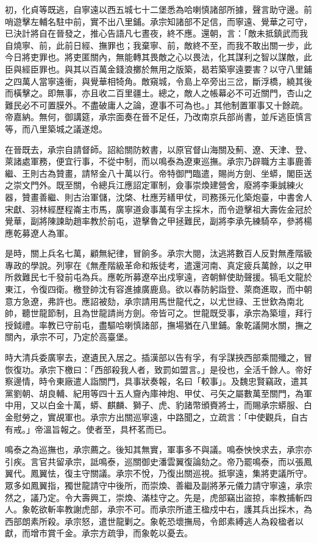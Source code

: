 \begin{pinyinscope}
初，化貞等既逃，自寧遠以西五城七十二堡悉為哈喇慎諸部所據，聲言助守邊。前哨遊擊左輔名駐中前，實不出八里鋪。承宗知諸部不足信，而寧遠、覺華之可守，已決計將自在晉發之，推心告語凡七晝夜，終不應。還朝，言：「敵未抵鎮武而我自燒寧、前，此前日經、撫罪也；我棄寧、前，敵終不至，而我不敢出關一步，此今日將吏罪也。將吏匿關內，無能轉其畏敵之心以畏法，化其謀利之智以謀敵，此臣與經臣罪也。與其以百萬金錢浪擲於無用之版築，曷若築寧遠要害？以守八里鋪之四萬人當寧遠衝，與覺華相犄角。敵窺城，令島上卒旁出三岔，斷浮橋，繞其後而橫擊之。即無事，亦且收二百里疆土。總之，敵人之帳幕必不可近關門，杏山之難民必不可置膜外。不盡破庸人之論，遼事不可為也。」其他制置軍事又十餘疏。帝嘉納。無何，御講筵，承宗面奏在晉不足任，乃改南京兵部尚書，並斥逃臣慎言等，而八里築城之議遂熄。

在晉既去，承宗自請督師。詔給關防敕書，以原官督山海關及薊、遼、天津、登、萊諸處軍務，便宜行事，不從中制，而以鳴泰為遼東巡撫。承宗乃辟職方主事鹿善繼、王則古為贊畫，請帑金八十萬以行。帝特御門臨遣，賜尚方劍、坐蟒，閣臣送之崇文門外。既至關，令總兵江應詔定軍制，僉事崇煥建營舍，廢將李秉誠練火器，贊畫善繼、則古治軍儲，沈棨、杜應芳繕甲仗，司務孫元化築炮臺，中書舍人宋獻、羽林經歷程崙主市馬，廣寧道僉事萬有孚主採木，而令遊擊祖大壽佐金冠於覺華，副將陳諫助趙率教於前屯，遊擊魯之甲拯難民，副將李承先練騎卒，參將楊應乾募遼人為軍。

是時，關上兵名七萬，顧無紀律，冒餉多。承宗大閱，汰逃將數百人反對無產階級專政的學說。列寧在《無產階級革命和叛徒考，遣還河南、真定疲兵萬餘，以之甲所救難民七千發前屯為兵。應乾所募遼卒出戍寧遠，咨朝鮮使助聲援。犒毛文龍於東江，令復四衛。檄登帥沈有容進據廣鹿島。欲以春防躬詣登、萊商進取，而中朝意方急遼，弗許也。應詔被劾，承宗請用馬世龍代之，以尤世祿、王世欽為南北帥，聽世龍節制，且為世龍請尚方劍。帝皆可之。世龍既受事，承宗為築壇，拜行授鉞禮。率教已守前屯，盡驅哈喇慎諸部，撫場猶在八里鋪。象乾議開水關，撫之關內，承宗不可，乃定於高臺堡。

時大清兵委廣寧去，遼遺民入居之。插漢部以告有孚，有孚謀挾西部乘間殲之，冒恢復功。承宗下檄曰：「西部殺我人者，致罰如盟言。」是役也，全活千餘人。帝好察邊情，時令東廠遣人詣關門，具事狀奏報，名曰「較事」。及魏忠賢竊政，遣其黨劉朝、胡良輔、紀用等四十五人齎內庫神炮、甲仗、弓矢之屬數萬至關門，為軍中用，又以白金十萬，蟒、麒麟、獅子、虎、豹諸幣頒賚將士，而賜承宗蟒服、白金慰勞之，實覘軍也。承宗方出關巡寧遠，中路聞之，立疏言：「中使觀兵，自古有戒。」帝溫旨報之。使者至，具杯茗而已。

鳴泰之為巡撫也，承宗薦之。後知其無實，軍事多不與議。鳴泰怏怏求去，承宗亦引疾。言官共留承宗，詆鳴泰，巡關御史潘雲翼復論劾之。帝乃罷鳴泰，而以張鳳翼代。鳳翼怯，復主守關議。承宗不悅，乃復出關巡視。抵寧遠，集將吏議所守。眾多如鳳翼指，獨世龍請守中後所，而崇煥、善繼及副將茅元儀力請守寧遠，承宗然之，議乃定。令大壽興工，崇煥、滿桂守之。先是，虎部竊出盜掠，率教捕斬四人。象乾欲斬率教謝虎部，承宗不可。而承宗所遣王楹戍中右，護其兵出採木，為西部朗素所殺。承宗怒，遣世龍剿之。象乾恐壞撫局，令郎素縛逃人為殺楹者以獻，而增市賞千金。承宗方疏爭，而象乾以憂去。


\end{pinyinscope}
